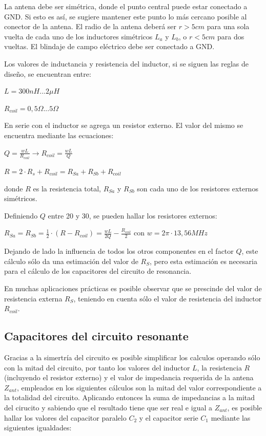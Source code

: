 
La antena debe ser simétrica, donde el punto central puede estar conectado a GND. Si esto es así, se sugiere mantener este punto lo más cercano posible al conector de la antena.
El radio de la antena deberá ser $r > 5cm$ para una sola vuelta de cada uno de los inductores simétricos $L_{a}$ y $L_{b}$, o $r < 5cm$ para dos vueltas.
El blindaje de campo eléctrico debe ser conectado a GND.

Los valores de inductancia y resistencia del inductor, si se siguen las reglas de diseño, se encuentran entre: 

$ L = 300nH {...} 2\mu H $

$ R_{coil} =0,5\Omega {...} 5\Omega $


\bigskip
\begin{itshape}
\end{itshape}


En serie con el inductor se agrega un resistor externo. El valor del mismo se encuentra mediante las ecuaciones:

\centerline{$ Q = \frac{w L}{R_{coil}} \rightarrow R_{coil} = \frac{w L}{Q}$}

\centerline{$ R = 2 \cdot R_{s} + R_{coil} = R_{Sa} + R_{Sb} + R_{coil} $}

donde $R$ es la resistencia total, $R_{Sa}$ y $R_{Sb}$ son cada uno de los resistores externos simétricos.

Definiendo $Q$ entre 20 y 30, se pueden hallar los resistores externos:

$R_{Sa} = R_{Sb} = \frac{1}{2} \cdot (R - R_{coil}) = \frac{wL}{2Q} - \frac{R_{coil}}{2}$ con $w = 2 \pi \cdot 13,56MHz$


Dejando de lado la influencia de todos los otros componentes en el factor $Q$, este cálculo sólo da una estimación del valor de $R_{S}$, pero esta estimación es necesaria para el cálculo de los capacitores del circuito de resonancia. 

\bigskip
\bigskip
	En muchas aplicaciones prácticas es posible observar que se prescinde del valor de 	resistencia externa $R_{S}$, teniendo en cuenta sólo el valor de resistencia del inductor $R_{coil}$.	

\subsection{Capacitores del circuito resonante}
Gracias a la simertría del circuito es posible simplificar los calculos operando sólo con la mitad del circuito, por tanto los valores del inductor $L$, la resistencia $R$ (incluyendo el resistor externo) y el valor de impedancia requerida de la antena $Z_{ant}$, empleados en los siguientes cálculos son la mitad del valor correspondiente a la totalidad del circuito. 
Aplicando entonces la suma de impedancias a la mitad del cirucito y sabiendo que el resultado tiene que ser real e igual a $Z_{ant}$, es posible hallar los valores del capacitor paralelo $C_{2}$ y el capacitor serie $C_{1}$ mediante las siguientes igualdades:

